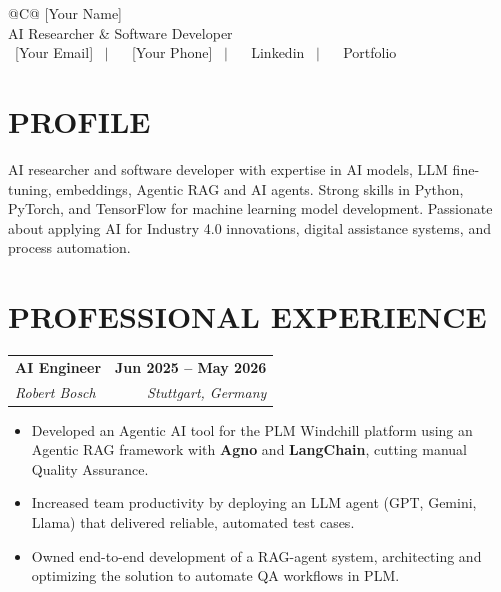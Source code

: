 \documentclass[a4paper,11pt]{article}
\makeatletter
\newcommand{\entryheader}[4]{%
  \begin{tabularx}{\textwidth}{@{}>{\RaggedRight\arraybackslash}X r@{}}
    \textbf{#1} & \textbf{#2} \\
    \textit{#3} & \textit{#4} \\
  \end{tabularx}%
}
\newenvironment{entrybullets}{%
  \begin{minipage}[t]{0.77\textwidth}
    \begin{itemize}[leftmargin=*,label=\textbullet,align=left]
}{%
    \end{itemize}
  \end{minipage}
}
\newcommand{\safehref}[2]{#2}
\let\href\safehref
\makeatother
\begin{document}
\pagestyle{empty}

\begin{tabularx}{\linewidth}{@{}C@{}}
  \Huge{[Your Name]}\\[10pt]
  
  \large{AI Researcher \& Software Developer}\\[3pt]


  \href{mailto: [Your Email]}{\raisebox{-0.05\height}{\faEnvelope} \ [Your Email]} \ $|$ \
  \href{tel:[Your Phone]}{ \ [Your Phone]} \ $|$ \
  \href{[Your LinkedIn URL]}{\raisebox{-0.05\height}{\faLinkedin} \ Linkedin} \ $|$ \
  \href{[Your Portfolio URL]}{\raisebox{-0.05\height}{\faLink} \ Portfolio}\\
\end{tabularx}

\section*{PROFILE}
AI researcher and software developer with expertise in AI models, LLM fine-tuning, embeddings, Agentic RAG and AI agents. Strong skills in Python, PyTorch, and TensorFlow for machine learning model development. Passionate about applying AI for Industry 4.0 innovations, digital assistance systems, and process automation.


\section*{PROFESSIONAL EXPERIENCE}
\entryheader{AI Engineer}{Jun 2025 -- May 2026}{Robert Bosch}{Stuttgart, Germany}
\begin{entrybullets}
  \item Developed an Agentic AI tool for the PLM Windchill platform using an Agentic RAG framework with \textbf{Agno} and \textbf{LangChain}, cutting manual Quality Assurance.
  \item Increased team productivity by deploying an LLM agent (GPT, Gemini, Llama) that delivered reliable, automated test cases.
  \item Owned end-to-end development of a RAG-agent system, architecting and optimizing the solution to automate QA workflows in PLM.
\end{entrybullets}
\end{document}
